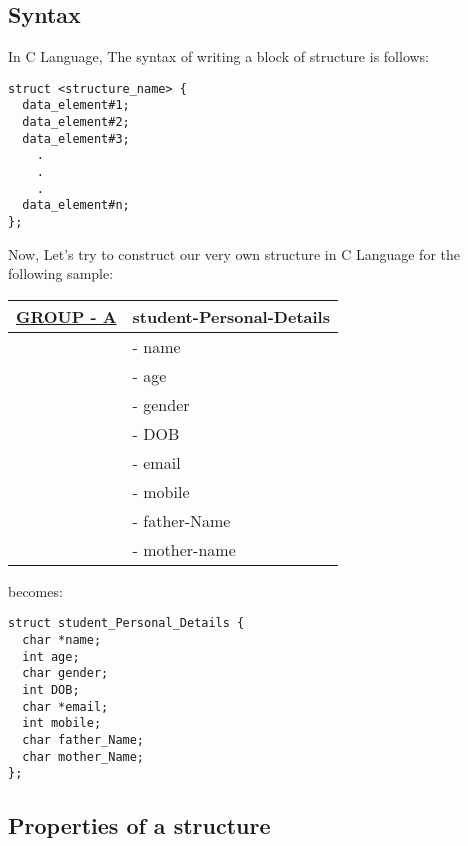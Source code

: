 \documentclass[11pt]{article}
\begin{document}
\subsection{Syntax}
\label{sec:org990101d}

In C Language, The syntax of writing a block of structure is follows:

\begin{verbatim}
struct <structure_name> {
  data_element#1;
  data_element#2;
  data_element#3;
    .
    .
    .
  data_element#n;
};
\end{verbatim}

Now, Let’s try to construct our very own structure in C Language for the
following sample:

\begin{center}
\begin{tabular}{ll}
\hline
\uline{GROUP - A} & \textbf{student-Personal-Details}\\
\hline
 & - name\\
 & - age\\
 & - gender\\
 & - DOB\\
 & - email\\
 & - mobile\\
 & - father-Name\\
 & - mother-name\\
\hline
\end{tabular}
\end{center}

becomes:

\begin{verbatim}
struct student_Personal_Details {
  char *name;
  int age;
  char gender;
  int DOB;
  char *email;
  int mobile;
  char father_Name;
  char mother_Name;
};
\end{verbatim}

\subsection{Properties of a structure}
\label{sec:org54d5535}
\end{document}

